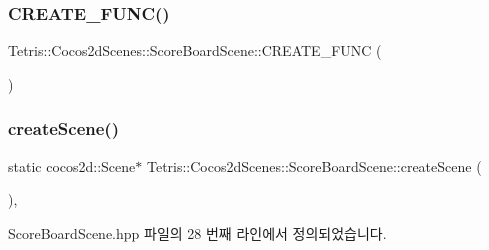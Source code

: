 \subsubsection{\texorpdfstring{C\+R\+E\+A\+T\+E\+\_\+\+F\+U\+N\+C()}{CREATE\_FUNC()}}
{\footnotesize\ttfamily Tetris\+::\+Cocos2d\+Scenes\+::\+Score\+Board\+Scene\+::\+C\+R\+E\+A\+T\+E\+\_\+\+F\+U\+NC (\begin{DoxyParamCaption}\item[{\hyperlink{class_tetris_1_1_cocos2d_scenes_1_1_score_board_scene}{Score\+Board\+Scene}}]{ }\end{DoxyParamCaption})}

\mbox{\label{class_tetris_1_1_cocos2d_scenes_1_1_score_board_scene_abedba06354b1f03d3f395e4c1841b8a6}} 
\subsubsection{\texorpdfstring{create\+Scene()}{createScene()}}
{\footnotesize\ttfamily static cocos2d\+::\+Scene$\ast$ Tetris\+::\+Cocos2d\+Scenes\+::\+Score\+Board\+Scene\+::create\+Scene (\begin{DoxyParamCaption}{ }\end{DoxyParamCaption})\hspace{0.3cm}{\ttfamily [inline]}, {\ttfamily [static]}}



Score\+Board\+Scene.\+hpp 파일의 28 번째 라인에서 정의되었습니다.


